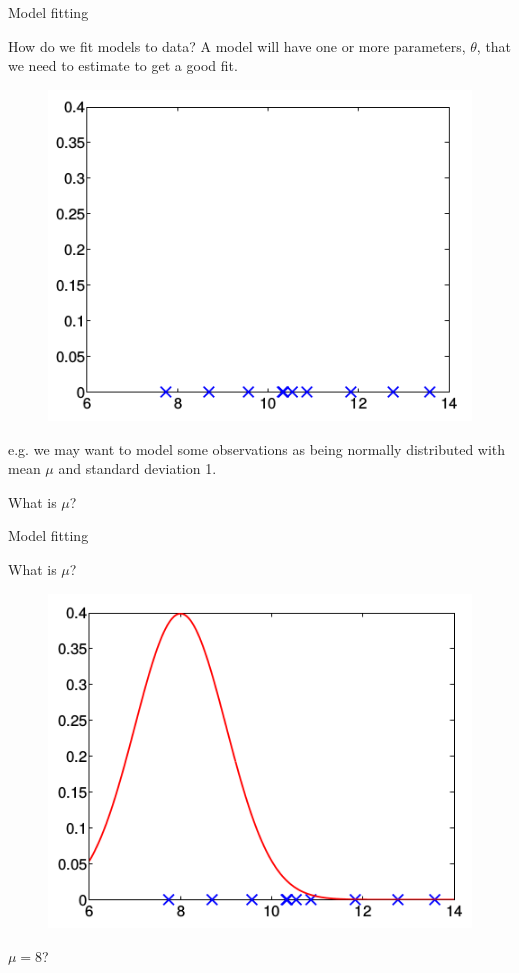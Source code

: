 \documentclass{beamer}
\begin{document}
\begin{frame}{Model fitting}

	How do we fit models to data? A model will have one or more 
	parameters, $\theta$, that we need to estimate to get a good fit.

	\begin{figure}
		\includegraphics[width=0.4\linewidth]{fit1.png}
	\end{figure}

	e.g. we may want to model some observations as being normally
	distributed with mean $\mu$ and standard deviation 1.
	\begin{center}
		What is $\mu$?
	\end{center}

\end{frame}

\begin{frame}{Model fitting}

	\begin{center}
                What is $\mu$?
        \end{center}

        \begin{figure}
                \includegraphics[width=0.4\linewidth]{fit2.png}
        \end{figure}

        $\mu=8$?

\end{frame}
\end{document}
